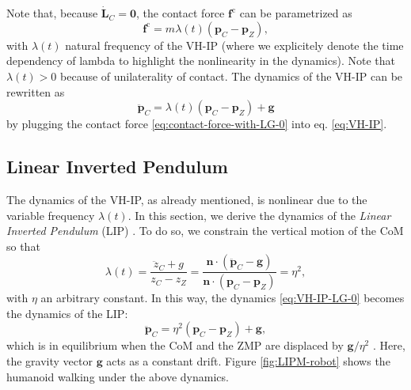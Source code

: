 Note that, because $\dot{\bm{L}}_C=\bm{0}$, the contact force
$\bm{f}^{\mathrm{c}}$ can be parametrized \cite{Caron2020ICRA} as
\begin{equation}
    \label{eq:contact-force-with-LG-0}
    \bm{f}^{\mathrm{c}} = m \lambda(t) (\bm{p}_C - \bm{p}_Z),
\end{equation}
with $\lambda(t)$ natural frequency of the VH-IP (where we explicitely
denote the time dependency of lambda to highlight the nonlinearity in the
dynamics). Note that $\lambda(t) > 0$ because
of unilaterality of contact.
The dynamics of the VH-IP can be rewritten as
\begin{equation}
    \label{eq:VH-IP-LG-0}
    \ddot{\bm{p}}_C = \lambda(t) (\bm{p}_C - \bm{p}_Z) + \bm{g}
\end{equation}
by plugging the contact force \eqref{eq:contact-force-with-LG-0} into
eq. \eqref{eq:VH-IP}.


\subsection{Linear Inverted Pendulum}
\label{sec:DynamicsHumanoidLocomotion:LinearInvertedPendulum}
The dynamics of the VH-IP, as already mentioned, is nonlinear due to the
variable frequency $\lambda(t)$. In this
section, we derive the dynamics of the \textit{Linear Inverted Pendulum} (LIP)
\cite{Kajita2016IntroductiontoHumanoidRobotics}. To do so,
we constrain the vertical motion of the CoM \cite{Zamparelli2018SYROCO} so that
\begin{equation}
    \lambda(t) = \frac{\ddot{z}_C + g}{z_C - z_Z} =
    \frac{\bm{n} \cdot (\ddot{\bm{p}}_C - \bm{g})}{\bm{n} \cdot (\bm{p}_C - \bm{p}_Z)} =
    \eta^2,
\end{equation}
with $\eta$ an arbitrary constant. In this way,
the dynamics \eqref{eq:VH-IP-LG-0} becomes the dynamics of the LIP:
\begin{equation}
    \label{eq:LIPM}
    \ddot{\bm{p}}_C = \eta^2 (\bm{p}_C - \bm{p}_Z) + \bm{g},
\end{equation}
which is in equilibrium when the CoM and the ZMP are displaced by
$\bm{g}/\eta^2$ \cite{Cipriano2023RAS}. Here, the gravity vector $\bm{g}$
acts as a constant drift. Figure \ref{fig:LIPM-robot} shows the humanoid walking
under the above dynamics.

